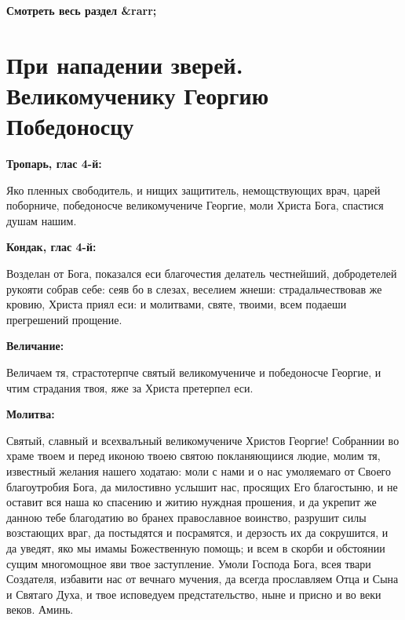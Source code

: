 \mychapterending


\bfseries Смотреть весь раздел &rarr;\normalfont{} 

\section{При нападении зверей.  Великомученику Георгию Победоносцу}
 


\bfseries Тропарь, глас 4-й:\normalfont{}


Яко пленных свободитель, и нищих защититель, немощствующих врач, царей поборниче, победоносче великомучениче Георгие, моли Христа Бога, спастися душам нашим.


\medskip


\bfseries Кондак, глас 4-й:\normalfont{}


Возделан от Бога, показался еси благочестия делатель честнейший, добродетелей рукояти собрав себе: сеяв бо в слезах, веселием жнеши: страдальчествовав же кровию, Христа приял еси: и молитвами, святе, твоими, всем подаеши прегрешений прощение.


\medskip


\bfseries Величание:\normalfont{}


Величаем тя, страстотерпче святый великомучениче и победоносче Георгие, и чтим страдания твоя, яже за Христа претерпел еси.


\medskip


\bfseries Молитва:\normalfont{}


Святый, славный и всехвалъный великомучениче Христов Георгие! Собраннии во храме твоем и перед иконою твоею святою покланяющиися людие, молим тя, известный желания нашего ходатаю: моли с нами и о нас умоляемаго от Своего благоутробия Бога, да милостивно услышит нас, просящих Его благостыню, и не оставит вся наша ко спасению и житию нуждная прошения, и да укрепит же данною тебе благодатию во бранех православное воинство, разрушит силы возстающих враг, да постыдятся и посрамятся, и дерзость их да сокрушится, и да уведят, яко мы имамы Божественную помощь; и всем в скорби и обстоянии сущим многомощное яви твое заступление. Умоли Господа Бога, всея твари Создателя, избавити нас от вечнаго мучения, да всегда прославляем Отца и Сына и Святаго Духа, и твое исповедуем предстательство, ныне и присно и во веки веков. Аминь.


